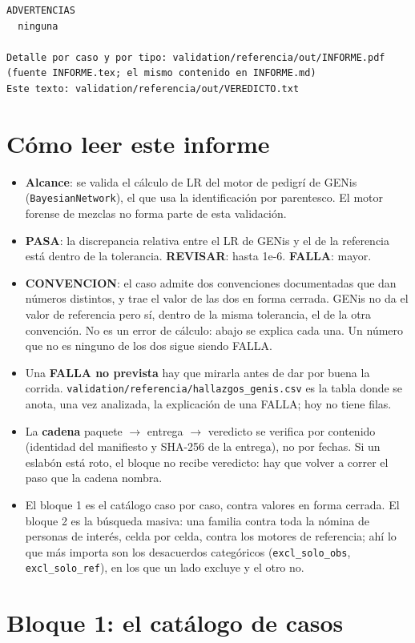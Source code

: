 \documentclass[11pt,a4paper]{article}
\begin{document}
\begin{Verbatim}
ADVERTENCIAS
  ninguna

Detalle por caso y por tipo: validation/referencia/out/INFORME.pdf (fuente INFORME.tex; el mismo contenido en INFORME.md)
Este texto: validation/referencia/out/VEREDICTO.txt
\end{Verbatim}

\section{Cómo leer este informe}
\begin{itemize}
  \item \textbf{Alcance}: se valida el cálculo de LR del motor de pedigrí de GENis (\texttt{BayesianNetwork}), el que usa la identificación por parentesco. El motor forense de mezclas no forma parte de esta validación.
  \item \textbf{PASA}: la discrepancia relativa entre el LR de GENis y el de la referencia está dentro de la tolerancia. \textbf{REVISAR}: hasta 1e-6. \textbf{FALLA}: mayor.
  \item \textbf{CONVENCION}: el caso admite dos convenciones documentadas que dan números distintos, y trae el valor de las dos en forma cerrada. GENis no da el valor de referencia pero sí, dentro de la misma tolerancia, el de la otra convención. No es un error de cálculo: abajo se explica cada una. Un número que no es ninguno de los dos sigue siendo FALLA.
  \item Una \textbf{FALLA no prevista} hay que mirarla antes de dar por buena la corrida. \texttt{validation/\allowbreak{}referencia/\allowbreak{}hallazgos\_genis.csv} es la tabla donde se anota, una vez analizada, la explicación de una FALLA; hoy no tiene filas.
  \item La \textbf{cadena} paquete $\rightarrow$ entrega $\rightarrow$ veredicto se verifica por contenido (identidad del manifiesto y SHA-256 de la entrega), no por fechas. Si un eslabón está roto, el bloque no recibe veredicto: hay que volver a correr el paso que la cadena nombra.
  \item El bloque 1 es el catálogo caso por caso, contra valores en forma cerrada. El bloque 2 es la búsqueda masiva: una familia contra toda la nómina de personas de interés, celda por celda, contra los motores de referencia; ahí lo que más importa son los desacuerdos categóricos (\texttt{excl\_solo\_obs}, \texttt{excl\_solo\_ref}), en los que un lado excluye y el otro no.
\end{itemize}

\section{Bloque 1: el catálogo de casos}
\end{document}
